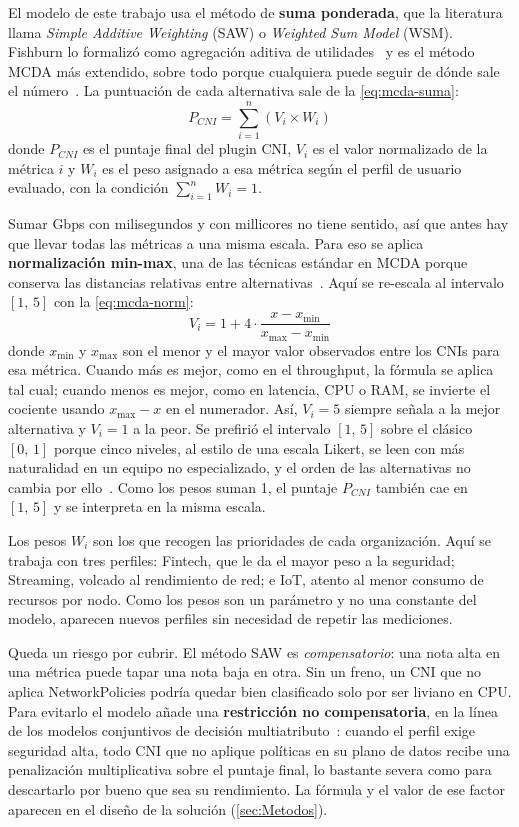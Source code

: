 El modelo de este trabajo usa el método de \textbf{suma ponderada}, que la literatura llama \emph{Simple Additive Weighting} (SAW) o \emph{Weighted Sum Model} (WSM). Fishburn lo formalizó como agregación aditiva de utilidades~\cite{ref30} y es el método MCDA más extendido, sobre todo porque cualquiera puede seguir de dónde sale el número~\cite{ref34}. La puntuación de cada alternativa sale de la \cref{eq:mcda-suma}:
\begin{equation}\label{eq:mcda-suma}
P_{CNI} = \sum_{i=1}^{n} (V_i \times W_i)
\end{equation}
donde $P_{CNI}$ es el puntaje final del plugin CNI, $V_i$ es el valor normalizado de la métrica $i$ y $W_i$ es el peso asignado a esa métrica según el perfil de usuario evaluado, con la condición $\sum_{i=1}^{n} W_i = 1$.

Sumar Gbps con milisegundos y con millicores no tiene sentido, así que antes hay que llevar todas las métricas a una misma escala. Para eso se aplica \textbf{normalización min-max}, una de las técnicas estándar en MCDA porque conserva las distancias relativas entre alternativas~\cite{ref35}. Aquí se re-escala al intervalo $[1,\,5]$ con la \cref{eq:mcda-norm}:
\begin{equation}\label{eq:mcda-norm}
V_i = 1 + 4 \cdot \frac{x - x_{\min}}{x_{\max} - x_{\min}}
\end{equation}
donde $x_{\min}$ y $x_{\max}$ son el menor y el mayor valor observados entre los CNIs para esa métrica. Cuando más es mejor, como en el throughput, la fórmula se aplica tal cual; cuando menos es mejor, como en latencia, CPU o RAM, se invierte el cociente usando $x_{\max} - x$ en el numerador. Así, $V_i = 5$ siempre señala a la mejor alternativa y $V_i = 1$ a la peor. Se prefirió el intervalo $[1,\,5]$ sobre el clásico $[0,\,1]$ porque cinco niveles, al estilo de una escala Likert, se leen con más naturalidad en un equipo no especializado, y el orden de las alternativas no cambia por ello~\cite{ref35}. Como los pesos suman 1, el puntaje $P_{CNI}$ también cae en $[1,\,5]$ y se interpreta en la misma escala.

Los pesos $W_i$ son los que recogen las prioridades de cada organización. Aquí se trabaja con tres perfiles: Fintech, que le da el mayor peso a la seguridad; Streaming, volcado al rendimiento de red; e IoT, atento al menor consumo de recursos por nodo. Como los pesos son un parámetro y no una constante del modelo, aparecen nuevos perfiles sin necesidad de repetir las mediciones.

Queda un riesgo por cubrir. El método SAW es \emph{compensatorio}: una nota alta en una métrica puede tapar una nota baja en otra. Sin un freno, un CNI que no aplica NetworkPolicies podría quedar bien clasificado solo por ser liviano en CPU. Para evitarlo el modelo añade una \textbf{restricción no compensatoria}, en la línea de los modelos conjuntivos de decisión multiatributo~\cite{ref31}: cuando el perfil exige seguridad alta, todo CNI que no aplique políticas en su plano de datos recibe una penalización multiplicativa sobre el puntaje final, lo bastante severa como para descartarlo por bueno que sea su rendimiento. La fórmula y el valor de ese factor aparecen en el diseño de la solución (\cref{sec:Metodos}).